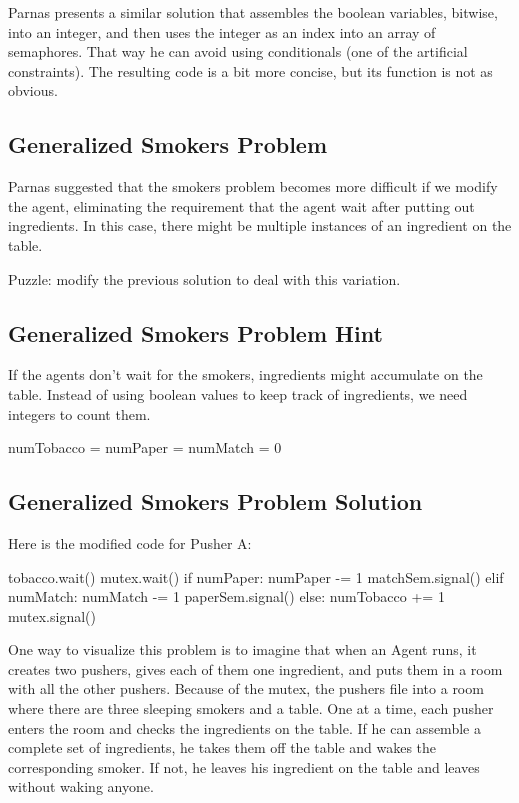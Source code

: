 \documentclass{book}
\begin{document}
Parnas presents a similar solution that assembles the
boolean variables, bitwise, into an integer, and then
uses the integer as an index into an array of semaphores.
That way he can avoid using conditionals (one of the
artificial constraints).  The resulting code is a bit
more concise, but its function is not as obvious.


\subsection{Generalized Smokers Problem}

Parnas suggested that the smokers problem becomes more
difficult if we modify the agent, eliminating the requirement
that the agent wait after putting out ingredients.  In this
case, there might be multiple instances of an ingredient on
the table.

Puzzle: modify the previous solution to deal with this
variation.


\subsection{Generalized Smokers Problem Hint}

If the agents don't wait for the smokers, ingredients might
accumulate on the table.  Instead of using boolean values to
keep track of ingredients, we need integers to count them.

\begin{unbreakable}[title={Generalized Smokers problem hint}]{}
numTobacco = numPaper = numMatch = 0
\end{unbreakable}



\subsection{Generalized Smokers Problem Solution}
\label{smoker}

Here is the modified code for Pusher A:

\begin{unbreakable}[title={Pusher A}]{}
tobacco.wait()
mutex.wait()
    if numPaper:
        numPaper -= 1
        matchSem.signal()
    elif numMatch:
        numMatch -= 1
        paperSem.signal()
    else: 
        numTobacco += 1
mutex.signal()
\end{unbreakable}

One way to visualize this problem is to imagine that when an
Agent runs, it creates two pushers, gives each of them one ingredient,
and puts them in a room with all the other pushers.  Because of the
mutex, the pushers file into a room where there are
three sleeping smokers and a table.  One at a time, each pusher enters
the room and checks the ingredients on the table.  If he can
assemble a complete set of ingredients, he takes them off the table
and wakes the corresponding smoker.  If not, he leaves his ingredient
on the table and leaves without waking anyone.
\end{document}
